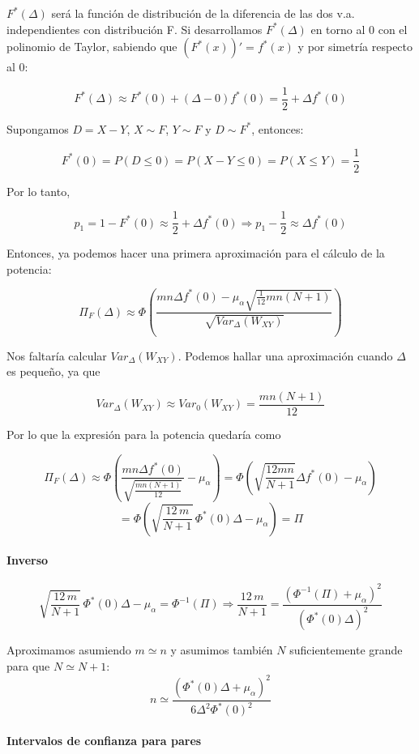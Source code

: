 $F^*(\Delta)$ será la función de distribución de la diferencia de las dos v.a. independientes con distribución F. Si desarrollamos $F^*(\Delta)$ en torno al 0 con el polinomio de Taylor, sabiendo que $(F^*(x))'=f^*(x)$ y por simetría respecto al 0:

$$
F^*(\Delta)\approx F^*(0)+(\Delta-0) f^*(0)=\frac{1}{2}+\Delta f^*(0)
$$

Supongamos $D=X-Y$, $X\sim F$, $Y\sim F$ y $D\sim F^*$, entonces:

$$
F^*(0)=P(D\leq 0)=P(X-Y\leq 0)=P(X\leq Y)=\frac{1}{2}
$$

Por lo tanto,

$$
p_1=1-F^*(0)\approx\frac{1}{2}+\Delta f^*(0) \Longrightarrow p_1-\frac{1}{2}\approx \Delta f^*(0)
$$

Entonces, ya podemos hacer una primera aproximación para el cálculo de la potencia:

$$
\Pi_F(\Delta)\approx \Phi\left(\frac{mn\Delta f^*(0)-\mu_\alpha\sqrt{\frac{1}{12}mn(N+1)}}{\sqrt{Var_\Delta(W_{XY})}}\right)
$$

Nos faltaría calcular $Var_\Delta(W_{XY})$. Podemos hallar una aproximación cuando $\Delta$ es pequeño, ya que 

$$
Var_\Delta(W_{XY})\approx Var_0(W_{XY})=\frac{mn(N+1)}{12}
$$

Por lo que la expresión para la potencia quedaría como

$$
\Pi_F(\Delta)\approx\Phi\left(\frac{mn\Delta f^*(0)}{\sqrt{\frac{mn(N+1)}{12}}}-\mu_\alpha\right)=\Phi\left(\sqrt{\frac{12mn}{N+1}}\Delta f^*(0)-\mu_\alpha\right)
$$
\[
    =\Phi\left(\sqrt{\frac{12 \, m}{N+1}} \, \Phi^*(0) \Delta - \mu_\alpha\right) = \Pi
\]

\newpage

\paragraph{Inverso}

\[
    \sqrt{\frac{12 \, m}{N+1}} \, \Phi^*(0) \Delta - \mu_\alpha = \Phi^{-1}(\Pi)
    \Longrightarrow 
    \frac{12 \, m}{N+1} = \frac{\left(\Phi^{-1}(\Pi) + \mu_\alpha\right)^2}{\left(\Phi^*(0) \Delta\right)^2}
\]

Aproximamos asumiendo $m \simeq  n$ y asumimos también $N$ suficientemente grande para que $N \simeq N+1$:
\[
    n \simeq \frac{\left(\Phi^*(0) \Delta + \mu_\alpha\right)^2}{6 \Delta^2 \Phi^*(0)^2}
\]

\paragraph{Intervalos de confianza para pares}

